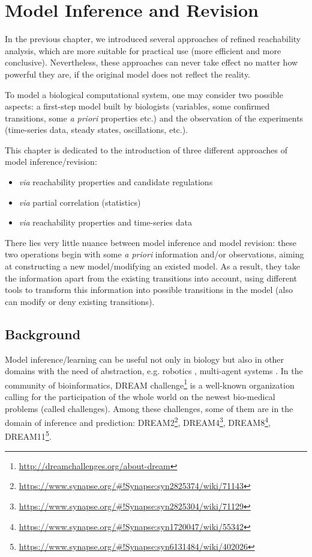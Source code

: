 \chapter{Model Inference and Revision}
\begin{mybox}
In the previous chapter, we introduced several approaches of refined reachability analysis, which are more suitable for practical use (more efficient and more conclusive).
Nevertheless, these approaches can never take effect no matter how powerful they are, if the original model does not reflect the reality.

To model a biological computational system, one may consider two possible aspects: a first-step model built by biologists (variables, some confirmed transitions, some \textit{a priori} properties etc.) and the observation of the experiments (time-series data, steady states, oscillations, etc.).

This chapter is dedicated to the introduction of three different approaches of model inference/revision:

\begin{itemize}
    \item \textit{via} reachability properties and candidate regulations
    \item \textit{via} partial correlation (statistics)
    \item \textit{via} reachability properties and time-series data
\end{itemize}

There lies very little nuance between model inference and model revision: these two operations begin with some \textit{a priori} information and/or observations, aiming at constructing a new model/modifying an existed model.
As a result, they take the information apart from the existing transitions into account, using different tools to transform this information into possible transitions in the model (also can modify or deny existing transitions).

\end{mybox}

\section{Background}
Model inference/learning can be useful not only in biology \cite{ribeiro2015learning} but also in other domains with the need of abstraction, e.g. robotics \cite{nguyen2011model}, multi-agent systems \cite{foerster2016learning}.
In the community of bioinformatics, DREAM  challenge\footnote{\url{http://dreamchallenges.org/about-dream}} is a well-known organization calling for the participation of the whole world on the newest bio-medical problems (called challenges). 
Among these challenges, some of them are in the domain of inference and prediction:
DREAM2\footnote{\url{https://www.synapse.org/\#!Synapse:syn2825374/wiki/71143}},
DREAM4\footnote{\url{https://www.synapse.org/\#!Synapse:syn2825304/wiki/71129}},
DREAM8\footnote{\url{https://www.synapse.org/\#!Synapse:syn1720047/wiki/55342}},
DREAM11\footnote{\url{https://www.synapse.org/\#!Synapse:syn6131484/wiki/402026}}.

